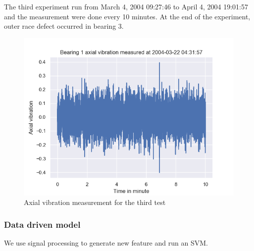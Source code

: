\documentclass[11pt, oneside]{article}   	%
\begin{document}
\justify
The third experiment run from March 4, 2004 09:27:46 to April 4, 2004 19:01:57 and the measurement were done every 10 minutes. At the end of the experiment, outer race defect occurred in bearing 3.
\begin{figure}[H] %
   \centering
   \includegraphics[width=7in]{thesis-pictures/bearing1-test3} 
   \caption{Axial vibration measurement for the third test}
   \label{fig:example}
\end{figure}

\subsubsection{Data driven model}
We use signal processing to generate new feature and run an SVM.
\end{document}
